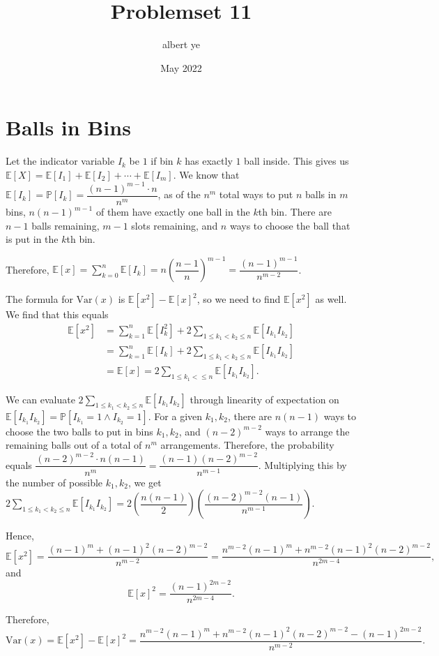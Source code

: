 \documentclass{article}
\title{Problemset 11}
\author{albert ye}
\date{May 2022}
\newcommand{\p}{\mathbb{P}}
\newcommand{\ex}{\mathbb{E}}
\newcommand{\Var}{\text{Var}}
\begin{document}
\maketitle
\section{Balls in Bins}
Let the indicator variable $I_k$ be $1$ if bin $k$ has exactly $1$ ball inside. This gives us $\ex[X] = \ex[I_1] + \ex[I_2] + \cdots + \ex[I_m]$. We know that $\ex[I_k] = \p[I_k] = \dfrac{(n-1)^{m-1} \cdot n}{n^m}$, as of the $n^m$ total ways to put $n$ balls in $m$ bins, $n(n-1)^{m-1}$ of them have exactly one ball in the $k$th bin. There are $n-1$ balls remaining, $m-1$ slots remaining, and $n$ ways to choose the ball that is put in the $k$th bin.

Therefore, $\ex[x] = \sum_{k=0}^n \ex[I_k] = n\left(\dfrac{n-1}{n}\right)^{m-1} = \dfrac{(n-1)^{m-1}}{n^{m-2}}$.

The formula for $\Var(x)$ is $\ex[x^2] - \ex[x]^2$, so we need to find $\ex[x^2]$ as well. We find that this equals
\begin{align*}
	\ex[x^2] &= \sum_{k = 1}^n \ex[I_k^2] + 2\sum_{1 \leq k_1 < k_2 \leq n} \ex[I_{k_1} I_{k_2}] \\
	&= \sum_{k=1}^n \ex[I_k] + 2\sum_{1 \leq k_1 < k_2 \leq n} \ex[I_{k_1} I_{k_2}] \\
	&= \ex[x] = 2\sum_{1 \leq k_1 < \leq n} \ex[I_{k_1} I_{k_2}].
\end{align*}

We can evaluate $2\sum_{1 \leq k_1 < k_2 \leq n} \ex[I_{k_1} I_{k_2}]$ through linearity of expectation on $\ex[I_{k_1} I_{k_2}] = \p[I_{k_1} = 1 \wedge I_{k_2} = 1]$. For a given $k_1, k_2$, there are $n(n-1)$ ways to choose the two balls to put in bins $k_1, k_2$, and $(n-2)^{m-2}$ ways to arrange the remaining balls out of a total of $n^m$ arrangements. Therefore, the probability equals $\dfrac{(n-2)^{m-2} \cdot n(n-1)}{n^m} = \dfrac{(n-1)(n-2)^{m-2}}{n^{m-1}}$. Multiplying this by the number of possible $k_1, k_2$, we get $2\sum_{1 \leq k_1 < k_2 \leq n} \ex[I_{k_1} I_{k_2}] = 2\left(\dfrac{n(n-1)}{2}\right)\left(\dfrac{(n-2)^{m-2}(n-1)}{n^{m-1}}\right)$.

Hence, $$\ex[x^2] = \dfrac{(n-1)^m + (n-1)^2(n-2)^{m-2}}{n^{m-2}} = \dfrac{n^{m-2}(n-1)^m + n^{m-2}(n-1)^2(n-2)^{m-2}}{n^{2m-4}},$$
and $$\ex[x]^2 = \dfrac{(n-1)^{2m-2}}{n^{2m-4}}.$$

Therefore, $$\Var(x) = \ex[x^2] - \ex[x]^2 = 
\boxed{\dfrac{n^{m-2}(n-1)^m + n^{m-2}(n-1)^2(n-2)^{m-2} - (n-1)^{2m-2}}{n^{m-2}}}.$$
\end{document}
